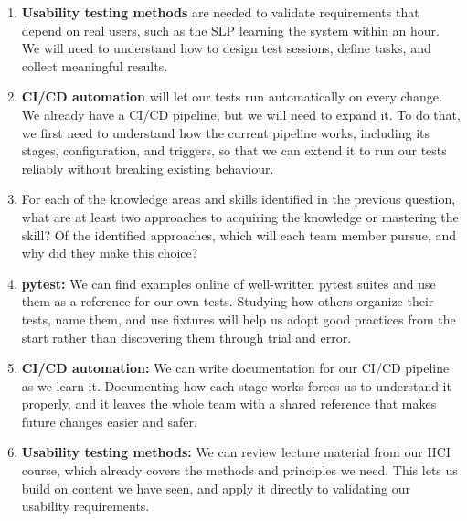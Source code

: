 \documentclass[12pt, titlepage]{article}
\begin{document}
\begin{enumerate}
    \item \textbf{Usability testing methods} are needed to validate requirements that depend on real users, such as the SLP learning the system within an hour. We will need to understand how to design test sessions, define tasks, and collect meaningful results.
    \item \textbf{CI/CD automation} will let our tests run automatically on every change. We already have a CI/CD pipeline, but we will need to expand it. To do that, we first need to understand how the current pipeline works, including its stages, configuration, and triggers, so that we can extend it to run our tests reliably without breaking existing behaviour.
  \item For each of the knowledge areas and skills identified in the previous
  question, what are at least two approaches to acquiring the knowledge or
  mastering the skill?  Of the identified approaches, which will each team
  member pursue, and why did they make this choice? \newline
    \item \textbf{pytest:} We can find examples online of well-written pytest suites and use them as a reference for our own tests. Studying how others organize their tests, name them, and use fixtures will help us adopt good practices from the start rather than discovering them through trial and error.
    \item \textbf{CI/CD automation:} We can write documentation for our CI/CD pipeline as we learn it. Documenting how each stage works forces us to understand it properly, and it leaves the whole team with a shared reference that makes future changes easier and safer.
    \item \textbf{Usability testing methods:} We can review lecture material from our HCI course, which already covers the methods and principles we need. This lets us build on content we have seen, and apply it directly to validating our usability requirements.
  
\end{enumerate}
\end{document}
